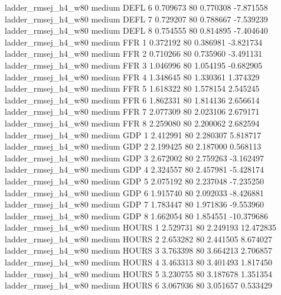 ladder_rmsej_h4_w80     medium     DEFL                 6  0.709673 80       0.770308          -7.871558
ladder_rmsej_h4_w80     medium     DEFL                 7  0.729207 80       0.788667          -7.539239
ladder_rmsej_h4_w80     medium     DEFL                 8  0.754555 80       0.814895          -7.404640
ladder_rmsej_h4_w80     medium      FFR                 1  0.372192 80       0.386981          -3.821734
ladder_rmsej_h4_w80     medium      FFR                 2  0.710266 80       0.735960          -3.491131
ladder_rmsej_h4_w80     medium      FFR                 3  1.046996 80       1.054195          -0.682905
ladder_rmsej_h4_w80     medium      FFR                 4  1.348645 80       1.330361           1.374329
ladder_rmsej_h4_w80     medium      FFR                 5  1.618322 80       1.578154           2.545245
ladder_rmsej_h4_w80     medium      FFR                 6  1.862331 80       1.814136           2.656614
ladder_rmsej_h4_w80     medium      FFR                 7  2.077309 80       2.023106           2.679171
ladder_rmsej_h4_w80     medium      FFR                 8  2.259080 80       2.200062           2.682594
ladder_rmsej_h4_w80     medium      GDP                 1  2.412991 80       2.280307           5.818717
ladder_rmsej_h4_w80     medium      GDP                 2  2.199425 80       2.187000           0.568113
ladder_rmsej_h4_w80     medium      GDP                 3  2.672002 80       2.759263          -3.162497
ladder_rmsej_h4_w80     medium      GDP                 4  2.324557 80       2.457981          -5.428174
ladder_rmsej_h4_w80     medium      GDP                 5  2.075192 80       2.237048          -7.235250
ladder_rmsej_h4_w80     medium      GDP                 6  1.915740 80       2.092033          -8.426881
ladder_rmsej_h4_w80     medium      GDP                 7  1.783447 80       1.971836          -9.553960
ladder_rmsej_h4_w80     medium      GDP                 8  1.662054 80       1.854551         -10.379686
ladder_rmsej_h4_w80     medium    HOURS                 1  2.529731 80       2.249193          12.472835
ladder_rmsej_h4_w80     medium    HOURS                 2  2.653282 80       2.441505           8.674027
ladder_rmsej_h4_w80     medium    HOURS                 3  3.763398 80       3.664213           2.706857
ladder_rmsej_h4_w80     medium    HOURS                 4  3.463313 80       3.401493           1.817450
ladder_rmsej_h4_w80     medium    HOURS                 5  3.230755 80       3.187678           1.351354
ladder_rmsej_h4_w80     medium    HOURS                 6  3.067936 80       3.051657           0.533429
